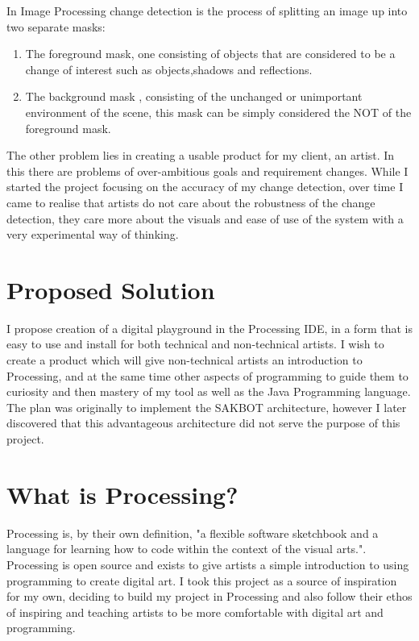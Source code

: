 \documentclass[a4paper]{report}
\begin{document}
In Image Processing change detection is the process of splitting an image up into two separate masks:
\begin{enumerate}
  \item The foreground mask, one consisting of objects that are considered to be a change of interest such as objects,shadows and reflections.
  \item The background mask , consisting of the unchanged or unimportant environment of the scene, this mask can be simply considered the NOT of the foreground mask.
\end{enumerate}

The other problem lies in creating a usable product for my client, an artist. In this there are problems of over-ambitious goals and requirement changes. While I started the project focusing on the accuracy of my change detection, over time I came to realise that artists do not care about the robustness of the change detection, they care more about the visuals and ease of use of the system with a very experimental way of thinking.

\section{Proposed Solution}
I propose creation of a digital playground in the Processing\cite{PROCESSING} IDE, in a form that is easy to use and install for both technical and non-technical artists. I wish to create a product which will give non-technical artists an introduction to Processing, and at the same time other aspects of programming to guide them to curiosity and then mastery of my tool as well as the Java Programming language. The plan was originally to implement the SAKBOT architecture\cite{SAKBOT}, however I later discovered that this advantageous architecture did not serve the purpose of this project.

\section{What is Processing?}
Processing is, by their own definition, "a flexible software sketchbook and a language for learning how to code within the context of the visual arts."\cite{PROCESSING}. Processing is open source and exists to give artists a simple introduction to using programming to create digital art. I took this project as a source of inspiration for my own, deciding to build my project in Processing and also follow their ethos of inspiring and teaching artists to be more comfortable with digital art and programming.
\end{document}
